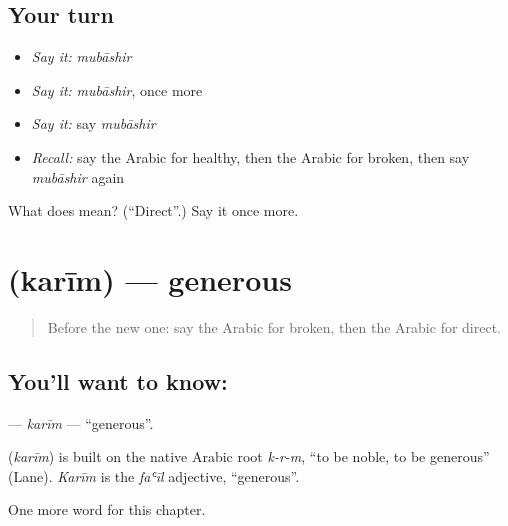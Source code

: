 \subsection*{Your turn}
\begin{itemize}
\raggedright
  \item \emph{Say it:} \emph{mubāshir}
  \item \emph{Say it:} \emph{mubāshir}, once more
  \item \emph{Say it:} say \emph{mubāshir}
  \item \emph{Recall:} say the Arabic for healthy, then the Arabic for broken, then say \emph{mubāshir} again
\end{itemize}

\begin{tcolorbox}[breakable,colback=teal!4,colframe=teal!35!black,title={Before you move on}]
What does  mean? (\textquotedblleft{}Direct\textquotedblright{}.) Say it once more.
\end{tcolorbox}
\section[\texorpdfstring{\ar{كريم} (karīm)}{كريم (karīm)}]{ (karīm) — generous}

\label{lesson:AR-C210-karim}



\begin{quote}
Before the new one: say the Arabic for broken, then the Arabic for direct.
\end{quote}

\subsection*{You'll want to know: }
\textbf{} — \emph{karīm} — \textquotedblleft{}generous\textquotedblright{}.

\begin{cousinweb}
\textbf{} (\emph{karīm}) is built on the native Arabic root \emph{k-r-m}, \textquotedblleft{}to be noble, to be generous\textquotedblright{} (Lane). \emph{Karīm} is the \emph{faʿīl} adjective, \textquotedblleft{}generous\textquotedblright{}.
\end{cousinweb}

\begin{grammarlens}[title={What you've built}]
One more word for this chapter.
\end{grammarlens}

